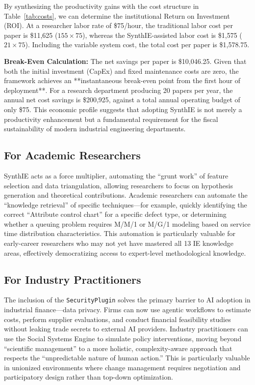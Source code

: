 \documentclass[12pt,a4paper]{article}
\begin{document}
By synthesizing the productivity gains with the cost structure in Table~\ref{tab:costs}, we can determine the institutional Return on Investment (ROI). At a researcher labor rate of \$75/hour, the traditional labor cost per paper is \$11,625 ($155 \times 75$), whereas the SynthIE-assisted labor cost is \$1,575 ($21 \times 75$). Including the variable system cost, the total cost per paper is \$1,578.75.

\textbf{Break-Even Calculation:} The net savings per paper is \$10,046.25. Given that both the initial investment (CapEx) and fixed maintenance costs are zero, the framework achieves an **instantaneous break-even point from the first hour of deployment**. For a research department producing 20 papers per year, the annual net cost savings is \$200,925, against a total annual operating budget of only \$75. This economic profile suggests that adopting SynthIE is not merely a productivity enhancement but a fundamental requirement for the fiscal sustainability of modern industrial engineering departments.

\subsection{For Academic Researchers}

SynthIE acts as a force multiplier, automating the ``grunt work'' of feature selection and data triangulation, allowing researchers to focus on hypothesis generation and theoretical contributions. Academic researchers can automate the ``knowledge retrieval'' of specific techniques—for example, quickly identifying the correct ``Attribute control chart'' for a specific defect type, or determining whether a queuing problem requires M/M/1 or M/G/1 modeling based on service time distribution characteristics. This automation is particularly valuable for early-career researchers who may not yet have mastered all 13 IE knowledge areas, effectively democratizing access to expert-level methodological knowledge.

\subsection{For Industry Practitioners}

The inclusion of the \texttt{SecurityPlugin} solves the primary barrier to AI adoption in industrial finance—data privacy. Firms can now use agentic workflows to estimate costs, perform supplier evaluations, and conduct financial feasibility studies without leaking trade secrets to external AI providers. Industry practitioners can use the Social Systems Engine to simulate policy interventions, moving beyond ``scientific management'' to a more holistic, complexity-aware approach that respects the ``unpredictable nature of human action.'' This is particularly valuable in unionized environments where change management requires negotiation and participatory design rather than top-down optimization.
\end{document}
